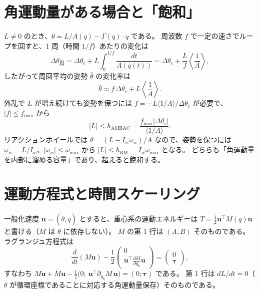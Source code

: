 \section{角運動量がある場合と「飽和」}\label{app:saturation}

$L\neq0$ のとき、$\dot\theta = L/A(q) - \Gamma(q)\cdot\dot q$ である。
周波数 $f$ で一定の速さでループを回すと、1 周（時間 $1/f$）あたりの変化は
\begin{equation}
\Delta\theta_{\text{周}} = \Delta\theta_c + L\int_0^{1/f}\frac{dt}{A(q(t))} = \Delta\theta_c + \frac{L}{f}\left\langle\frac1A\right\rangle,
\end{equation}
したがって周回平均の姿勢 $\bar\theta$ の変化率は
\begin{equation}
\dot{\bar\theta} \approx f\,\Delta\theta_c + L\left\langle\frac1A\right\rangle .
\end{equation}
外乱で $L$ が増え続けても姿勢を保つには $f = -L\langle 1/A\rangle/\Delta\theta_c$ が必要で、$|f|\le f_{\max}$ から
\begin{equation}
|L| \le h_{\mathrm{AMBAC}} = \frac{f_{\max}|\Delta\theta_c|}{\langle 1/A\rangle}.
\end{equation}
リアクションホイールでは $\dot\theta = (L-I_w\omega_w)/A$ なので、姿勢を保つには $\omega_w = L/I_w$、$|\omega_w|\le\omega_{\max}$ から $|L|\le h_{\mathrm{RW}} = I_w\omega_{\max}$ となる。
どちらも「角運動量を内部に溜める容量」であり、超えると飽和する。

\section{運動方程式と時間スケーリング}\label{app:eom}

一般化速度 $\bm u = (\dot\theta,\dot q)$ とすると、重心系の運動エネルギーは $T = \tfrac12\bm u^\top M(q)\bm u$ と書ける（$M$ は $\theta$ に依存しない）。
$M$ の第 1 行は $(A, B)$ そのものである。ラグランジュ方程式は
\begin{equation}
\frac{d}{dt}\left(M\bm u\right) - \frac12\begin{pmatrix}0\\ \bm u^\top\frac{\partial M}{\partial q_k}\bm u\end{pmatrix} = \begin{pmatrix}0\\ \bm\tau\end{pmatrix},
\end{equation}
すなわち $M\dot{\bm u} + \dot M\bm u - \tfrac12\bigl(0;\ \bm u^\top\partial_{q_k}M\,\bm u\bigr) = (0;\bm\tau)$ である。
第 1 行は $dL/dt=0$（$\theta$ が循環座標であることに対応する角運動量保存）そのものである。

